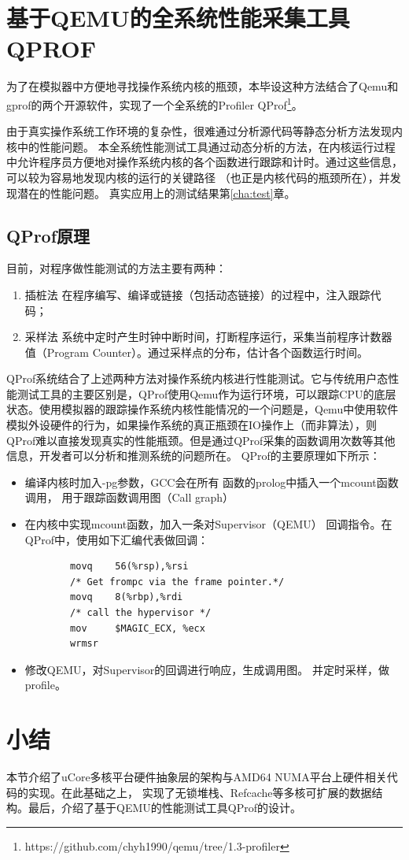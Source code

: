 \section{基于QEMU的全系统性能采集工具QPROF}
为了在模拟器中方便地寻找操作系统内核的瓶颈，本毕设这种方法结合了Qemu和gprof的两个开源软件，实现了一个全系统的Profiler
\pozhehao
QProf\footnote{https://github.com/chyh1990/qemu/tree/1.3-profiler}。

由于真实操作系统工作环境的复杂性，很难通过分析源代码等静态分析方法发现内核中的性能问题。
本全系统性能测试工具通过动态分析的方法，在内核运行过程中允许程序员方便地对操作系统内核的各个函数进行跟踪和计时。通过这些信息，可以较为容易地发现内核的运行的关键路径
（也正是内核代码的瓶颈所在），并发现潜在的性能问题。
真实应用上的测试结果第\ref{cha:test}章。

\subsection{QProf原理}
	目前，对程序做性能测试的方法主要有两种：
	\begin{enumerate}
		\item {\heiti 插桩法}
			在程序编写、编译或链接（包括动态链接）的过程中，注入跟踪代码；
		\item {\heiti 采样法}
			系统中定时产生时钟中断时间，打断程序运行，采集当前程序计数器值（Program
			Counter）。通过采样点的分布，估计各个函数运行时间。
	\end{enumerate}

	QProf系统结合了上述两种方法对操作系统内核进行性能测试。它与传统用户态性能测试工具的主要区别是，QProf使用Qemu作为运行环境，可以跟踪CPU的底层状态。使用模拟器的跟踪操作系统内核性能情况的一个问题是，Qemu中使用软件模拟外设硬件的行为，如果操作系统的真正瓶颈在IO操作上（而非算法），则QProf难以直接发现真实的性能瓶颈。但是通过QProf采集的函数调用次数等其他信息，开发者可以分析和推测系统的问题所在。 QProf的主要原理如下所示：
	\begin{itemize}
		\item 编译内核时加入-pg参数，GCC会在所有
			函数的prolog中插入一个mcount函数调用，
			用于跟踪函数调用图（Call graph）
		\item 在内核中实现mcount函数，加入一条对Supervisor（QEMU）
			回调指令。在QProf中，使用如下汇编代表做回调：
\begin{lstlisting}
        movq    56(%rsp),%rsi
        /* Get frompc via the frame pointer.*/
        movq    8(%rbp),%rdi
        /* call the hypervisor */
        mov     $MAGIC_ECX, %ecx
        wrmsr
\end{lstlisting}
		\item 修改QEMU，对Supervisor的回调进行响应，生成调用图。
			并定时采样，做profile。
	\end{itemize}

\section{小结}

本节介绍了uCore多核平台硬件抽象层的架构与AMD64
NUMA平台上硬件相关代码的实现。在此基础之上，
实现了无锁堆栈、Refcache等多核可扩展的数据结构。最后，介绍了基于QEMU的性能测试工具QProf的设计。
